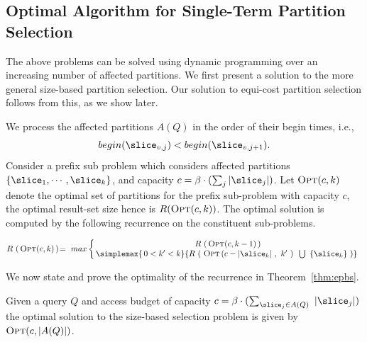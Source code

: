 \subsection{Optimal Algorithm for Single-Term Partition Selection}

The above problems can be solved using dynamic programming over an
increasing number of affected partitions. We first present a solution to the more general size-based partition selection. Our solution to equi-cost partition selection follows from this, as we show later. 

We process the affected partitions $A(Q)$ in the order of their begin times, i.e., $$begin(\slice_{v,j}) < begin(\slice_{v,j+1}).$$ Consider a prefix sub problem which considers affected partitions $\{\slice_{1}, \cdots, \slice_{k} \} $, and capacity $c = \beta \cdot (\sum_{j}|\slice_{j}|) $. Let $\textsc{Opt}(c,k)$ denote the optimal set of partitions for the prefix sub-problem with capacity $c$, the optimal result-set size hence is $R(\textsc{Opt}(c,k))$. The optimal solution is computed by the following recurrence on the constituent sub-problems. 


\begin{equation*}
R\,\left(\,\textsc{Opt}(c,k)\,\right) \!=\! \,\,\, max
\left\{\begin{array}{c@{\,\,\,}c}
 R\, \left(\,\textsc{Opt}(c,k-1)\,\right)\\
 \!\!\simplemax{\,0 < k' < k}{  R\,\left(\,\,\textsc{Opt}\left(c-|\slice_{k}|\,\,,\,\,k'\,\,\right)\,\,
  \, \bigcup \,\,\,\{\slice_{k}\} \,\,\right)} 
 \end{array}\right.
\end{equation*}

We now state and prove the optimality of the recurrence in Theorem~\ref{thm:epbs}.

\begin{theorem}
  \label{thm:epbs}
     Given a query $Q$ and access budget of capacity $c = \beta \cdot (\sum_{\slice_j \in A(Q)}\,\,|\slice_{j}|)$ the optimal solution to the size-based selection problem is given by $\textsc{Opt}(c,|A(Q)|)$. 
\end{theorem}

